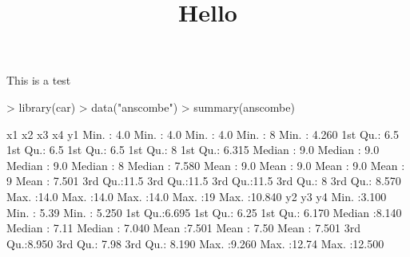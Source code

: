 \documentclass{article}
\title{Hello}
\begin{document}
\maketitle

This is a test

\begin{Schunk}
\begin{Sinput}
> library(car)
> data("anscombe")
> summary(anscombe)
\end{Sinput}
\begin{Soutput}
       x1             x2             x3             x4           y1        
 Min.   : 4.0   Min.   : 4.0   Min.   : 4.0   Min.   : 8   Min.   : 4.260  
 1st Qu.: 6.5   1st Qu.: 6.5   1st Qu.: 6.5   1st Qu.: 8   1st Qu.: 6.315  
 Median : 9.0   Median : 9.0   Median : 9.0   Median : 8   Median : 7.580  
 Mean   : 9.0   Mean   : 9.0   Mean   : 9.0   Mean   : 9   Mean   : 7.501  
 3rd Qu.:11.5   3rd Qu.:11.5   3rd Qu.:11.5   3rd Qu.: 8   3rd Qu.: 8.570  
 Max.   :14.0   Max.   :14.0   Max.   :14.0   Max.   :19   Max.   :10.840  
       y2              y3              y4        
 Min.   :3.100   Min.   : 5.39   Min.   : 5.250  
 1st Qu.:6.695   1st Qu.: 6.25   1st Qu.: 6.170  
 Median :8.140   Median : 7.11   Median : 7.040  
 Mean   :7.501   Mean   : 7.50   Mean   : 7.501  
 3rd Qu.:8.950   3rd Qu.: 7.98   3rd Qu.: 8.190  
 Max.   :9.260   Max.   :12.74   Max.   :12.500  
\end{Soutput}
\end{Schunk}
\end{document}
